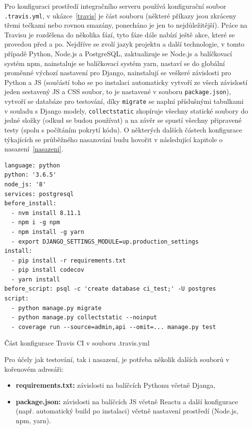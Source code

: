     Pro konfiguraci prostředí integračního serveru používá konfigurační soubor \verb|.travis.yml|, v ukázce~\ref{travis} je část souboru (některé příkazy jsou zkráceny třemi tečkami nebo rovnou smazány, ponecháno je jen to nejdůležitější). Práce na Travisu je rozdělena do několika fází, tyto fáze dále nabízí ještě akce, které se provedou před a po. Nejdříve se zvolí jazyk projektu a další technologie, v tomto případě Python, Node.js a PostgreSQL, zaktualizuje se Node.js a balíčkovací systém npm, nainstaluje se balíčkovací systém yarn, nastaví se do globální proměnné výchozí nastavení pro Django, nainstalují se veškeré závislosti pro Python a JS (součástí toho se po instalaci automaticky vytvoří ze všech závislostí jeden sestavený JS a CSS soubor, to je nastavené v souboru \verb|package.json|), vytvoří se databáze pro testování, díky \verb|migrate| se naplní příslušnými tabulkami v souladu s Django modely, \verb|collectstatic| zkopíruje všechny statické soubory do jedné složky (odkud se budou používat) a na závěr se spustí všechny připravené testy (spolu s počítáním pokrytí kódu). O některých dalších částech konfigurace týkajících se průběžného nasazování budu hovořit v následující kapitole o nasazení~\ref{nasazeni}.
    
    \begin{listing}[ht]
    	\begin{verbatim}
language: python
python: '3.6.5'
node_js: '8'
services: postgresql
before_install:
  - nvm install 8.11.1
  - npm i -g npm
  - npm install -g yarn
  - export DJANGO_SETTINGS_MODULE=up.production_settings
install:
  - pip install -r requirements.txt
  - pip install codecov
  - yarn install
before_script: psql -c 'create database ci_test;' -U postgres
script:
  - python manage.py migrate
  - python manage.py collectstatic --noinput
  - coverage run --source=admin,api --omit=... manage.py test
    	\end{verbatim}
    	\caption{Část konfigurace Travis CI v souboru .travis.yml}\label{travis}
    \end{listing}
    
    Pro účely jak testování, tak i nasazení, je potřeba několik dalších souborů v kořenovém adresáři:
    \begin{itemize}
        \item \textbf{requirements.txt:} závislosti na balíčcích Pythonu včetně Djanga,
        \item \textbf{package.json:} závislosti na balíčcích JS včetně Reactu a další konfigurace (např. automatický build po instalaci) včetně nastavení prostředí (Node.js, npm, yarn).
    \end{itemize}
    
